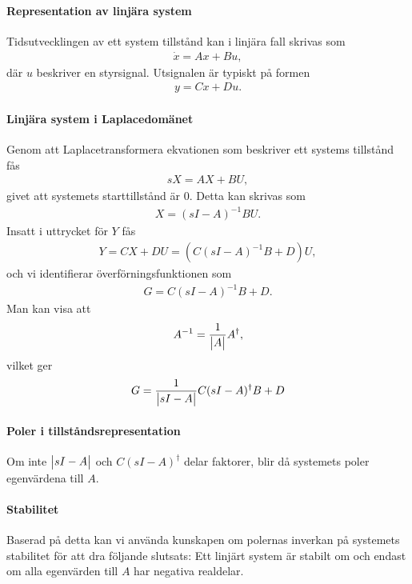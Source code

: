 \paragraph{Representation av linjära system}
Tidsutvecklingen av ett system tillstånd kan i linjära fall skrivas som
\begin{align*}
	\dot{x} = Ax + Bu,
\end{align*}
där $u$ beskriver en styrsignal. Utsignalen är typiskt på formen
\begin{align*}
	y = Cx + Du.
\end{align*}

\paragraph{Linjära system i Laplacedomänet}
Genom att Laplacetransformera ekvationen som beskriver ett systems tillstånd fås
\begin{align*}
	sX = AX + BU,
\end{align*}
givet att systemets starttillstånd är $0$. Detta kan skrivas som
\begin{align*}
	X = (sI - A)^{-1}BU.
\end{align*}
Insatt i uttrycket för $Y$ fås
\begin{align*}
	Y = CX + DU = (C(sI - A)^{-1}B + D)U,
\end{align*}
och vi identifierar överförningsfunktionen som
\begin{align*}
	G = C(sI - A)^{-1}B + D.
\end{align*}
Man kan visa att
\begin{align*}
	A^{-1} = \frac{1}{\mdet{A}}A^{\dagger},
\end{align*}
vilket ger
\begin{align*}
	G = \frac{1}{\mdet{sI - A}}C(sI - A)^{\dagger}B + D
\end{align*}

\paragraph{Poler i tillståndsrepresentation}
Om inte $\mdet{sI - A}$ och $C(sI - A)^{\dagger}$ delar faktorer, blir då systemets poler egenvärdena till $A$.

\paragraph{Stabilitet}
Baserad på detta kan vi använda kunskapen om polernas inverkan på systemets stabilitet för att dra följande slutsats: Ett linjärt system är stabilt om och endast om alla egenvärden till $A$ har negativa realdelar.

